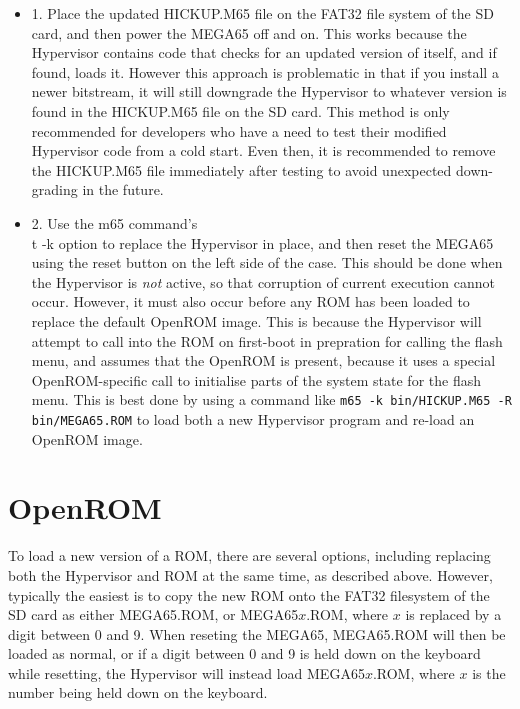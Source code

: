 \begin{itemize}
	\item 1. Place the updated HICKUP.M65 file on the FAT32 file system of the SD card, and then power the MEGA65 off and on.  This works because the Hypervisor contains code that checks for an updated version of itself, and if found, loads it. However this approach is problematic in that if you install a newer bitstream, it will still downgrade the Hypervisor to whatever version is found in the HICKUP.M65 file on the SD card.  This method is only recommended for developers who have a need to test their modified Hypervisor code from a cold start. Even then, it is recommended to remove the HICKUP.M65 file immediately after testing to avoid unexpected down-grading in the future.
	\item 2. Use the m65 command's {\\t -k} option to replace the Hypervisor in place, and then reset the MEGA65 using the reset button on the left side of the case.  This should be done when the Hypervisor is {\em not} active, so that corruption of current execution cannot occur. However, it must also occur before any ROM has been loaded to replace the default OpenROM image.  This is because the Hypervisor will attempt to call into the ROM on first-boot in prepration for calling the flash menu, and assumes that the OpenROM is present, because it uses a special OpenROM-specific call to initialise parts of the system state for the flash menu.  This is best done by using a command like {\tt m65 -k bin/HICKUP.M65 -R bin/MEGA65.ROM} to load both a new Hypervisor program and re-load an OpenROM image.
\end{itemize}

\section{OpenROM}

To load a new version of a ROM, there are several options, including replacing both the Hypervisor and ROM at the same time, as described above. However, typically the easiest is to copy the new ROM onto the FAT32 filesystem of the SD card as either MEGA65.ROM, or MEGA65$x$.ROM, where $x$ is replaced by a digit between 0 and 9.  When reseting the MEGA65, MEGA65.ROM will then be loaded as normal, or if a digit between 0 and 9 is held down on the keyboard while resetting, the Hypervisor will instead load MEGA65$x$.ROM, where $x$ is the number being held down on the keyboard.
